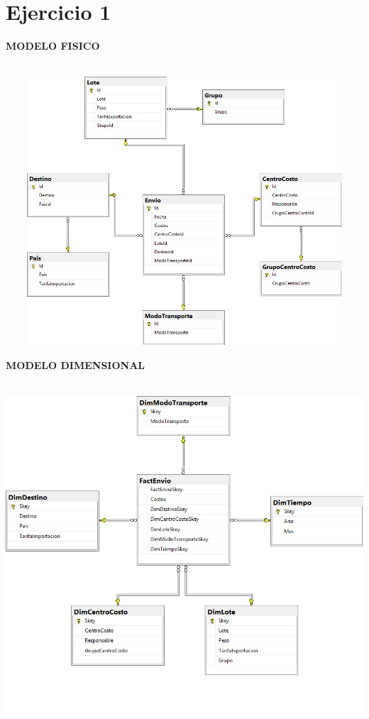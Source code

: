 \documentclass[12pt,letterpaper]{article}
\begin{document}
\section{Ejercicio 1}
\textbf{MODELO FISICO}\\\\
\begin{center} 
\includegraphics[width=14cm,height=10cm,keepaspectratio]{imagenes/e1.png}\\
\end{center} 
\newpage
\textbf{MODELO DIMENSIONAL}\\\\
\begin{center} 
\includegraphics[width=14cm]{imagenes/d1.png}\\
\end{center} 
\end{document}
